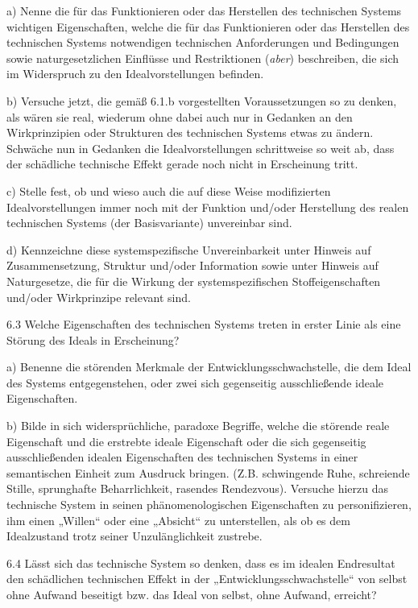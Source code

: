 \documentclass[12pt,a4paper]{article}
\begin{document}
a) Nenne die für das Funktionieren oder das Herstellen des technischen Systems
wichtigen Eigenschaften, welche die für das Funktionieren oder das Herstellen
des technischen Systems notwendigen technischen Anforderungen und Bedingungen
sowie naturgesetzlichen Einflüsse und Restriktionen (\emph{aber}) beschreiben,
die sich im Widerspruch zu den Idealvorstellungen befinden.

b) Versuche jetzt, die gemäß 6.1.b vorgestellten Voraussetzungen so zu denken,
als wären sie real, wiederum ohne dabei auch nur in Gedanken an den
Wirkprinzipien oder Strukturen des technischen Systems etwas zu ändern.
Schwäche nun in Gedanken die Idealvorstellungen schrittweise so weit ab, dass
der schädliche technische Effekt gerade noch nicht in Erscheinung tritt.

c) Stelle fest, ob und wieso auch die auf diese Weise modifizierten
Idealvorstellungen immer noch mit der Funktion und/oder Herstellung des realen
technischen Systems (der Basisvariante) unvereinbar sind.

d) Kennzeichne diese systemspezifische Unvereinbarkeit unter Hinweis auf
Zusammensetzung, Struktur und/oder Information sowie unter Hinweis auf
Naturgesetze, die für die Wirkung der systemspezifischen Stoffeigenschaften
und/oder Wirkprinzipe relevant sind.

6.3 Welche Eigenschaften des technischen Systems treten in erster Linie als
eine Störung des Ideals in Erscheinung?

a) Benenne die störenden Merkmale der Entwicklungsschwachstelle, die dem Ideal
des Systems entgegenstehen, oder zwei sich gegenseitig ausschließende ideale
Eigenschaften.

b) Bilde in sich widersprüchliche, paradoxe Begriffe, welche die störende reale
Eigenschaft und die erstrebte ideale Eigenschaft oder die sich gegenseitig
ausschließenden idealen Eigenschaften des technischen Systems in einer
semantischen Einheit zum Ausdruck bringen. (Z.B. schwingende Ruhe, schreiende
Stille, sprunghafte Beharrlichkeit, rasendes Rendezvous). Versuche hierzu das
technische System in seinen phänomenologischen Eigenschaften zu
personifizieren, ihm einen „Willen“ oder eine „Absicht“ zu unterstellen, als ob
es dem Idealzustand trotz seiner Unzulänglichkeit zustrebe.

6.4 Lässt sich das technische System so denken, dass es im idealen Endresultat
den schädlichen technischen Effekt in der „Entwicklungsschwachstelle“ von
selbst ohne Aufwand beseitigt bzw. das Ideal von selbst, ohne Aufwand,
erreicht?
\end{document}

